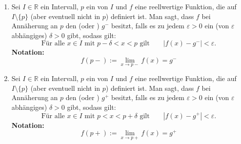 \begin{enumerate}
    \item Sei $I \in \mathbb{R}$ ein Intervall, $p$ ein  von $I$ und $f$ eine reellwertige Funktion, die auf $I \setminus \{p\}$ (aber eventuell nicht in $p$) definiert ist. Man sagt, dass $f$ bei Annäherung an $p$
    den  (oder ) $g^-$ besitzt, falls es zu jedem $\varepsilon > 0$ ein (von $\varepsilon$ abhängiges) $\delta > 0$ gibt, sodass gilt:
    $$\text{Für alle $x \in I$ mit $p - \delta < x < p$ gilt} \qquad | f (x) - g^- | < \varepsilon.$$
    \textbf{Notation:}
    $$f(p-) := \lim_{x \to p-} f(x) = g^-$$
    \item Sei $I \in \mathbb{R}$ ein Intervall, $p$ ein  von $I$ und $f$ eine reellwertige Funktion, die auf $I \setminus \{p\}$ (aber eventuell nicht in $p$) definiert ist. Man sagt, dass $f$ bei Annäherung an $p$
    den  (oder ) $g^+$ besitzt, falls es zu jedem $\varepsilon > 0$ ein (von $\varepsilon$ abhängiges) $\delta > 0$ gibt, sodass gilt:
    $$\text{Für alle $x \in I$ mit $p < x < p + \delta$ gilt} \qquad | f (x) - g^+ | < \varepsilon.$$
    \textbf{Notation:}
    $$f(p+) := \lim_{x \to p+} f(x) = g^+$$ 
\end{enumerate}